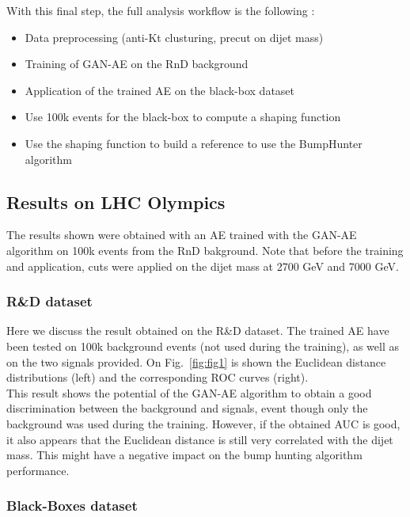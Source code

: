 \documentclass[letterpaper,11pt]{article}
\begin{document}
\noindent With this final step, the full analysis workflow is the following :
\begin{itemize}
	\item Data preprocessing (anti-Kt clusturing, precut on dijet mass)
	\item Training of GAN-AE on the RnD background
	\item Application of the trained AE on the black-box dataset
	\item Use 100k events for the black-box to compute a shaping function
	\item Use the shaping function to build a reference to use the BumpHunter algorithm
\end{itemize}



\subsection{Results on LHC Olympics}
\label{sec:results}

\noindent The results shown were obtained with an AE trained with the GAN-AE algorithm on 100k events from the RnD bakground.
Note that before the training and application, cuts were applied on the dijet mass at 2700 GeV and 7000 GeV.


\subsubsection{R\&D dataset}
\label{sec:RnD}

\noindent Here we discuss the result obtained on the R\&D dataset.
The trained AE have been tested on 100k background events (not used during the training), as well as on the two signals provided.
On Fig.~\ref{fig:fig1} is shown the Euclidean distance distributions (left) and the corresponding ROC curves (right).\\

\noindent This result shows the potential of the GAN-AE algorithm to obtain a good discrimination between the background and signals, event though only the background was used during the training.
However, if the obtained AUC is good, it also appears that the Euclidean distance is still very correlated with the dijet mass.
This might have a negative impact on the bump hunting algorithm performance.

\subsubsection{Black-Boxes dataset}
\label{sec:BB}
\end{document}
